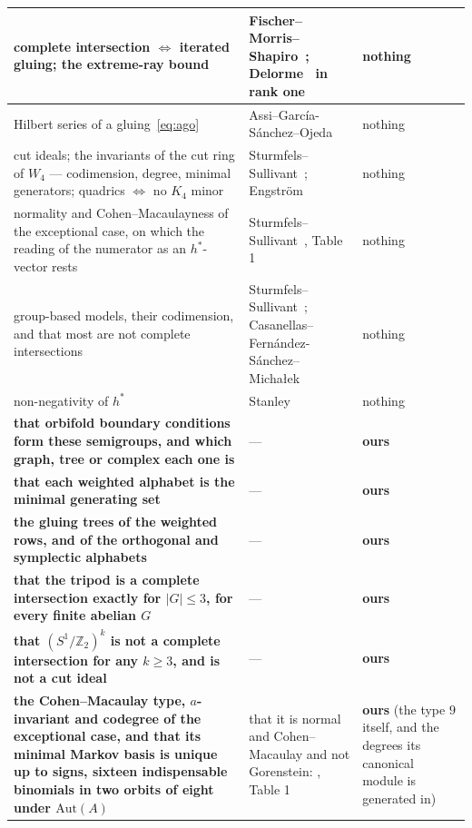 \documentclass[11pt,a4paper]{article}
\theoremstyle{definition}
\newcommand{\ZZ}{\mathbb{Z}}
\begin{document}
{\begin{longtable}{p{6.2cm}p{4.2cm}p{4.2cm}}
complete intersection $\iff$ iterated gluing; the extreme-ray bound &
Fischer--Morris--Shapiro~\cite{FMS}; Delorme~\cite{Delorme} in rank one & nothing\\
\midrule
\rowcolor{softgrey}
Hilbert series of a gluing~\eqref{eq:ago} & Assi--Garc\'ia-S\'anchez--Ojeda~\cite{AGO} & nothing\\
\midrule
cut ideals; the invariants of the cut ring of $W_4$ --- codimension, degree, minimal generators;
quadrics $\iff$ no $K_4$ minor &
Sturmfels--Sullivant~\cite{SScuts}; Engstr\"om~\cite{Engstrom} & nothing\\
\midrule
\rowcolor{softgrey}
normality and Cohen--Macaulayness of the exceptional case, on which the reading of the numerator as
an $h^*$-vector rests & Sturmfels--Sullivant~\cite{SScuts}, Table 1 & nothing\\
\midrule
group-based models, their codimension, and that most are not complete intersections &
Sturmfels--Sullivant~\cite{SSphylo}; Casanellas--Fern\'andez-S\'anchez--Micha{\l}ek~\cite{CFM} &
nothing\\
\midrule
\rowcolor{softgrey}
non-negativity of $h^*$ & Stanley~\cite{Stanley} & nothing\\
\midrule
\textbf{that orbifold boundary conditions form these semigroups, and which graph, tree or complex
each one is} & --- & \textbf{ours}\\
\midrule
\rowcolor{softgrey}
\textbf{that each weighted alphabet is the minimal generating set} & --- & \textbf{ours}\\
\midrule
\textbf{the gluing trees of the weighted rows, and of the orthogonal and symplectic alphabets} &
--- & \textbf{ours}\\
\midrule
\rowcolor{softgrey}
\textbf{that the tripod is a complete intersection exactly for $|G|\le3$, for every finite abelian
$G$} & --- & \textbf{ours}\\
\midrule
\textbf{that $(S^1/\ZZ_2)^k$ is not a complete intersection for any $k\ge3$, and is not a cut
ideal} & --- & \textbf{ours}\\
\midrule
\rowcolor{softgrey}
\textbf{the Cohen--Macaulay type, $a$-invariant and codegree of the exceptional case, and that
its minimal Markov basis is unique up to signs, sixteen indispensable binomials in two
orbits of eight under $\mathrm{Aut}(A)$} &
that it is normal and Cohen--Macaulay and not Gorenstein: \cite{SScuts}, Table 1 &
\textbf{ours} (the type $9$ itself, and the degrees its canonical module is generated in)\\
\bottomrule
\end{longtable}}
\end{document}
